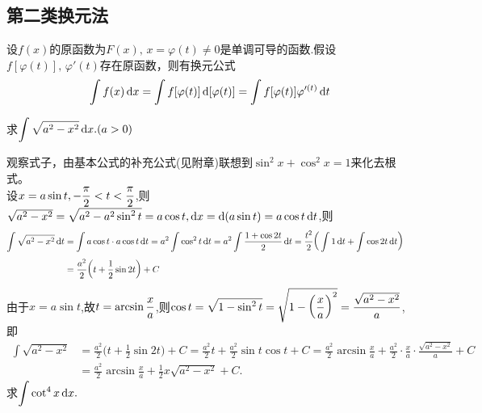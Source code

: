 \subsection{第二类换元法}
\vspace*{-1em}
\theorem[第二类换元法]  设$f(x)$的原函数为$F(x) , \,x=\varphi(t) \neq 0$是单调可导的函数.假设$f[\varphi (t)],\, \varphi'(t)$存在原函数，则有换元公式
\begin{equation}
	\displaystyle\int f(x) \,{\rm{d}} x=\int f[\varphi(t)] \,{\rm{d}} [\varphi(t)]=\int f[\varphi(t)]\varphi'^{(t)} \,{\rm{d}} t
\end{equation}
\vspace{-0.5em}

\noindent \examples 求$\displaystyle\int \sqrt{a^2-x^2} \,{\rm{d}} x.(a>0)$
\vspace*{-0.5em}

\solvereason 观察式子，由基本公式的补充公式(见附章)联想到$\sin^2 x+\cos^2 x=1$来化去根式。\\[1em]
\solve 设$\displaystyle x=a\sin t,-\frac{\pi}{2}<t<\frac{\pi}{2}$,则$\sqrt{a^2-x^2}=\sqrt{a^2-a^2\sin^2 t}=a\cos t,{\rm{d}} x={\rm{d}}(a\sin t )=a\cos t \,{\rm{d}} t$,则
\vspace*{-1em}
\begin{align*}
	\int \sqrt{a^2-x^2}\,{\rm{d}} t&=\int a\cos t\cdot a\cos t \,{\rm{d}} t=a^2\int \cos^2 t \,{\rm{d}} t=a^2\int \frac{1+\cos 2t}{2} \,{\rm{d}} t=\frac{t^2}{2}\bigg(\int 1 \,{\rm{d}} t+\int \cos 2t \,{\rm{d}} t\bigg)&\\[0.3em]
	&=\frac{a^2}{2}\bigg(t+\frac{1}{2}\sin 2t\bigg)+C
\end{align*}
由于$x=a\sin t$,故$t=\arcsin\displaystyle\frac{x}{a}$,则$\displaystyle\cos t=\sqrt{1-\sin^2 t}=\sqrt{1-\bigg(\frac{x}{a}\bigg)^2}=\frac{\sqrt{a^2-x^2}}{a}$,即
\begin{align*}
	\int \sqrt{a^2-x^2}&=\frac{a^2}{2}\bigg(t+\frac{1}{2}\sin 2t\bigg)+C=\frac{a^2}{2}t+\frac{a^2}{2}\sin t\cos t+C=\frac{a^2}{2}\arcsin \frac{x}{a}+\frac{a^2}{2}\cdot\frac{x}{a}\cdot\frac{\sqrt{a^2-x^2}}{a}+C&\\[0.5em]
	&=\frac{a^2}{2}\arcsin\frac{x}{a}+\frac{1}{2}x\sqrt{a^2-x^2}+C.
\end{align*}
\vspace*{-1em}\vspace*{-1em}
\examples 求$\displaystyle\int \cot^4 x \,{\rm{d}} x.$

